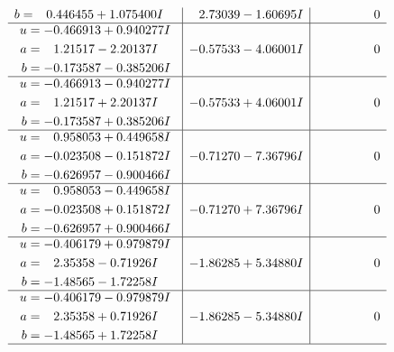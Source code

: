 \documentclass[1p]{elsarticle_modified}
\theoremstyle{definition}
\begin{document}
$$\begin{array}{c|c|c}
\begin{aligned}
b &= \phantom{-}0.446455 + 1.075400 I\end{aligned}
 & \phantom{-}2.73039 - 1.60695 I & \phantom{-0.000000 } 0 \\ \hline\begin{aligned}
u &= -0.466913 + 0.940277 I \\
a &= \phantom{-}1.21517 - 2.20137 I \\
b &= -0.173587 - 0.385206 I\end{aligned}
 & -0.57533 - 4.06001 I & \phantom{-0.000000 } 0 \\ \hline\begin{aligned}
u &= -0.466913 - 0.940277 I \\
a &= \phantom{-}1.21517 + 2.20137 I \\
b &= -0.173587 + 0.385206 I\end{aligned}
 & -0.57533 + 4.06001 I & \phantom{-0.000000 } 0 \\ \hline\begin{aligned}
u &= \phantom{-}0.958053 + 0.449658 I \\
a &= -0.023508 - 0.151872 I \\
b &= -0.626957 - 0.900466 I\end{aligned}
 & -0.71270 - 7.36796 I & \phantom{-0.000000 } 0 \\ \hline\begin{aligned}
u &= \phantom{-}0.958053 - 0.449658 I \\
a &= -0.023508 + 0.151872 I \\
b &= -0.626957 + 0.900466 I\end{aligned}
 & -0.71270 + 7.36796 I & \phantom{-0.000000 } 0 \\ \hline\begin{aligned}
u &= -0.406179 + 0.979879 I \\
a &= \phantom{-}2.35358 - 0.71926 I \\
b &= -1.48565 - 1.72258 I\end{aligned}
 & -1.86285 + 5.34880 I & \phantom{-0.000000 } 0 \\ \hline\begin{aligned}
u &= -0.406179 - 0.979879 I \\
a &= \phantom{-}2.35358 + 0.71926 I \\
b &= -1.48565 + 1.72258 I\end{aligned}
 & -1.86285 - 5.34880 I & \phantom{-0.000000 } 0\\
 \hline 
 \end{array}$$\newpage$$\begin{array}{c|c|c}  

\end{array}$$
\end{document}
